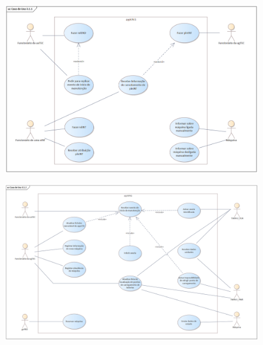 \documentclass{article}
\begin{document}
%
    \pagebreak
    \begin{figure}[H]
        \centering
        \vspace*{1.1cm}
        \includegraphics[origin=c, angle=-90, scale=0.85]{1st_Use_Case.png}
    \end{figure}

    \pagebreak
    \begin{figure}[H]
        \centering
        \vspace*{-0.2cm}
        \includegraphics[origin=c, angle=-90, scale=0.75]{2nd_Use_Case.png}
    \end{figure}
\end{document}
